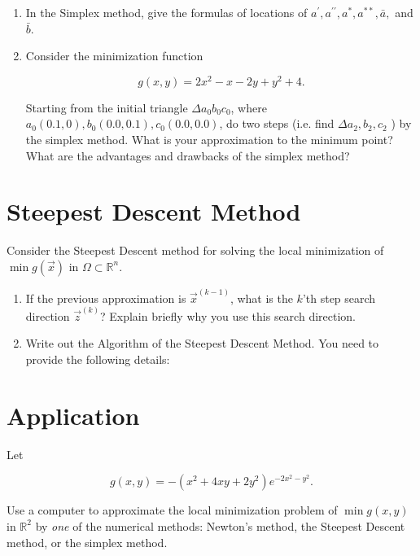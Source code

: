 \documentclass[11pt,oneside]{extarticle}
\newcommand{\Real}{\mathbb{R}}
\newcommand{\dprime}{{\prime\prime}}
\begin{document}
    \begin{enumerate}

        \item In the Simplex method, give the formulas of locations of
            $a^\prime, a^\dprime, a^*, a^{**}, \bar{a},$ and $\bar{b}$.

        \item Consider the minimization function

            $$g(x,y) = 2x^2 - x - 2y + y^2 + 4.$$

            Starting from the initial triangle $\Delta a_0b_0c_0$, where
            $a_0(0.1,0), b_0(0.0,0.1), c_0(0.0,0.0)$, do two steps (i.e. find
            $\Delta a_2,b_2,c_2$ ) by the simplex method. What is your approximation
            to the minimum point? What are the advantages and drawbacks of the
            simplex method?

    \end{enumerate}

\section{Steepest Descent Method}

Consider the Steepest Descent method for solving the local minimization of
$\min g(\vec{x})$ in $\Omega\subset\Real^n$.

    \begin{enumerate}

        \item If the previous approximation is $\vec{x}^{(k-1)}$, what is the
            $k$'th step search direction $\vec{z}^{(k)}$? Explain briefly why
            you use this search direction.

        \item Write out the Algorithm of the Steepest Descent Method. You need
            to provide the following details:

    \end{enumerate}

\section{Application}

Let

$$g(x,y) = -\left( x^2 + 4xy + 2y^2 \right) e^{ -2x^2 - y^2 }.$$

Use a computer to approximate the local minimization problem of $\min g(x,y)$
in $\Real^2$ by \emph{one} of the numerical methods: Newton's method, the Steepest
Descent method, or the simplex method.
\end{document}
